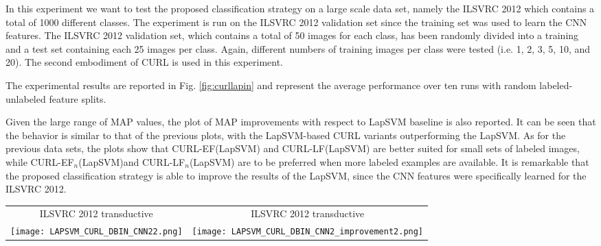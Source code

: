 \documentclass[journal,11pt]{IEEEtran}
\newcommand{\coso}{strategy}
\newcommand{\emb}{embodiment}
\newcommand{\curllaplf}{CURL-LF(LapSVM)}
\newcommand{\curllaplfn}{CURL-LF$_n$(LapSVM)}
\newcommand{\curllapef}{CURL-EF(LapSVM)}
\newcommand{\curllapefn}{CURL-EF$_n$(LapSVM)}
\begin{document}
In this experiment we want to test the proposed classification \coso{ }on a large scale data set, namely the ILSVRC 2012 which contains a total of 1000 different classes. The experiment is run on the ILSVRC 2012 validation set since the training set was used to learn the CNN features. The ILSVRC 2012 validation set, which contains a total of 50 images for each class, has been randomly divided into a training and a test set containing each 25 images per class. Again, different numbers of training images per class were tested (i.e. 1, 2, 3, 5, 10, and 20). The second \emb{ } of CURL is used in this experiment.

The experimental results are reported in Fig. \ref{fig:curllapin} and represent the average performance over ten runs with random labeled-unlabeled feature splits.

Given the large range of MAP values, the plot of MAP improvements with respect to LapSVM baseline is also reported. It can be seen that the behavior is similar to that of the previous plots, with the LapSVM-based CURL variants outperforming the LapSVM. As for the previous data sets, the plots show that \curllapef{ }and \curllaplf{ }are better suited for small sets of labeled images, while \curllapefn and \curllaplfn{ }are to be preferred when more labeled examples are available. It is remarkable that the proposed classification \coso{ }is able to improve the results of the LapSVM, since the CNN features were specifically learned for the ILSVRC 2012.


\begin{figure*}[!htbp]%
\centering
\begin{tabular}{cc}
\footnotesize{ILSVRC 2012 transductive}  & \footnotesize{ILSVRC 2012 transductive}  \\
\texttt{[image: LAPSVM\_CURL\_DBIN\_CNN22.png]} &
\texttt{[image: LAPSVM\_CURL\_DBIN\_CNN2\_improvement2.png]} \\
\end{tabular}
\caption{Mean Average Precision (MAP) varying the number of labeled images per class, obtained on the ILSVRC 2012 data set: MAP values (left) and MAP improvements over LapSVM baseline (right). Results are obtained using GIST, PHOG, LBP and CNN features.}%
\label{fig:curllapin}%
\end{figure*}
\end{document}
